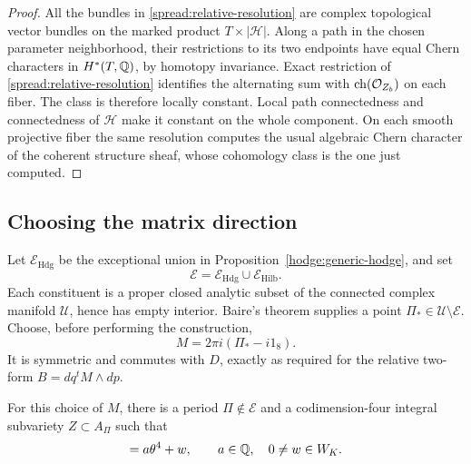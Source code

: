 \begin{proof}
All the bundles in \eqref{spread:relative-resolution} are complex
topological vector bundles on the marked product
$T\times|\mathcal H|$.  Along a path in the chosen parameter neighborhood,
their restrictions to its two endpoints have equal Chern characters
in $H^*(T,\mathbb Q)$, by homotopy invariance.  Exact restriction of
\eqref{spread:relative-resolution} identifies the alternating sum with
$\operatorname{ch}(\mathcal O_{Z_b})$ on each fiber.  The class is therefore locally
constant.  Local path connectedness and connectedness of $\mathcal H$
make it constant on the whole component.  On each smooth projective
fiber the same resolution computes the usual algebraic Chern character
of the coherent structure sheaf, whose cohomology class is the one just
computed.
\end{proof}

\subsection{Choosing the matrix direction}

Let $\mathcal E_{\mathrm{Hdg}}$ be the exceptional union in
Proposition~\ref{hodge:generic-hodge}, and set
\[
 \mathcal E=\mathcal E_{\mathrm{Hdg}}\cup
               \mathcal E_{\mathrm{Hilb}}.
\]
Each constituent is a proper closed analytic subset of the connected
complex manifold $\mathcal U$, hence has empty interior.  Baire's
theorem supplies a point $\Pi_*\in\mathcal U\setminus\mathcal E$.
Choose, before performing the construction,
\begin{equation}
 M=2\pi i(\Pi_*-i1_8).
 \label{spread:direction}
\end{equation}
It is symmetric and commutes with $D$, exactly as required for the
relative two-form $B=dq^tM\wedge dp$.

\begin{proposition}
\label{spread:period-selection}
For this choice of $M$, there is a period $\Pi\notin\mathcal E$
and a codimension-four integral subvariety $Z\subset A_\Pi$ such that
\begin{equation}
 [Z]=a\theta^4+w,\qquad a\in\Q,\quad 0\ne w\in W_K.
 \label{spread:selected-cycle}
\end{equation}
\end{proposition}


